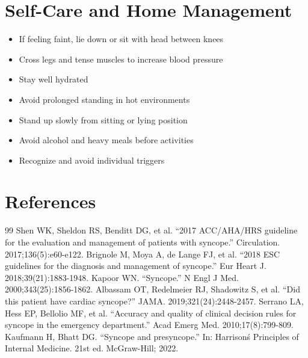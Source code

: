 \section*{Self-Care and Home Management}
\begin{itemize}
\item If feeling faint, lie down or sit with head between knees
\item Cross legs and tense muscles to increase blood pressure
\item Stay well hydrated
\item Avoid prolonged standing in hot environments
\item Stand up slowly from sitting or lying position
\item Avoid alcohol and heavy meals before activities
\item Recognize and avoid individual triggers
\end{itemize}

\section*{References}
\begin{thebibliography}{99}
 Shen WK, Sheldon RS, Benditt DG, et al. ``2017 ACC/AHA/HRS guideline for the evaluation and management of patients with syncope.'' Circulation. 2017;136(5):e60-e122.
 Brignole M, Moya A, de Lange FJ, et al. ``2018 ESC guidelines for the diagnosis and management of syncope.'' Eur Heart J. 2018;39(21):1883-1948.
 Kapoor WN. ``Syncope.'' N Engl J Med. 2000;343(25):1856-1862.
 Albassam OT, Redelmeier RJ, Shadowitz S, et al. ``Did this patient have cardiac syncope?'' JAMA. 2019;321(24):2448-2457.
 Serrano LA, Hess EP, Bellolio MF, et al. ``Accuracy and quality of clinical decision rules for syncope in the emergency department.'' Acad Emerg Med. 2010;17(8):799-809.
 Kaufmann H, Bhatt DG. ``Syncope and presyncope.'' In: Harrison\'s Principles of Internal Medicine. 21st ed. McGraw-Hill; 2022.
\end{thebibliography}
